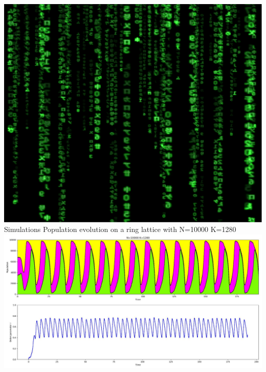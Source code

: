 \documentclass[serif,mathserif]{beamer}
\begin{document}
\begin{frame}{\includegraphics[height=0.06\textheight]{matrix.eps}\hspace{0.25cm} Simulations}
    \centering
    Population evolution on a ring lattice with N=10000 K=1280\\
    \vspace{0.4cm}
    \includegraphics[width=\textwidth]{pop-evolution-stacked-K_1280.eps}
\end{frame}
\end{document}
